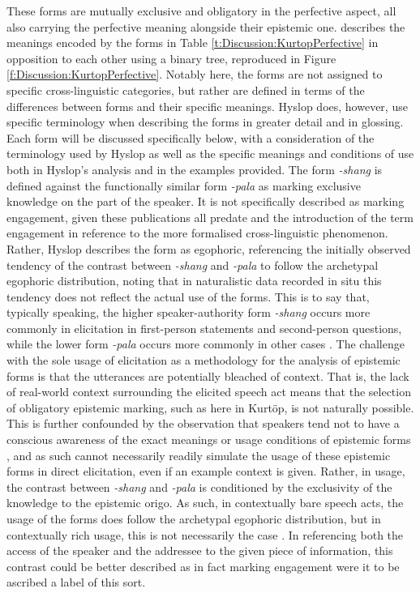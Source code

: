 These forms are mutually exclusive and obligatory in the perfective aspect, all also carrying the perfective meaning alongside their epistemic one.  describes the meanings encoded by the forms in Table \ref{t:Discussion:KurtopPerfective} in opposition to each other using a binary tree, reproduced in Figure \ref{f:Discussion:KurtopPerfective}. Notably here, the forms are not assigned to specific cross-linguistic categories, but rather are defined in terms of the differences between forms and their specific meanings. Hyslop does, however, use specific terminology when describing the forms in greater detail and in glossing. Each form will be discussed specifically below, with a consideration of the terminology used by Hyslop as well as the specific meanings and conditions of use both in Hyslop's analysis and in the examples provided.
The form \textit{-shang} is defined against the functionally similar form \textit{-pala} as marking exclusive knowledge on the part of the speaker. It is not specifically described as marking engagement, given these publications all predate  and the introduction of the term engagement in reference to the more formalised cross-linguistic phenomenon. Rather, Hyslop describes the form as egophoric, referencing the initially observed tendency of the contrast between \textit{-shang} and \textit{-pala} to follow the archetypal egophoric distribution, noting that in naturalistic data recorded in situ this tendency does not reflect the actual use of the forms. This is to say that, typically speaking, the higher speaker-authority form \textit{-shang} occurs more commonly in elicitation in first-person statements and second-person questions, while the lower form \textit{-pala} occurs more commonly in other cases \cite[129]{Hyslop2018}. The challenge with the sole usage of elicitation as a methodology for the analysis of epistemic forms is that the utterances are potentially bleached of context. That is, the lack of real-world context surrounding the elicited speech act means that the selection of obligatory epistemic marking, such as here in Kurtöp, is not naturally possible. This is further confounded by the observation that speakers tend not to have a conscious awareness of the exact meanings or usage conditions of epistemic forms \cite{Grzech2020}, and as such cannot necessarily readily simulate the usage of these epistemic forms in direct elicitation, even if an example context is given. Rather, in usage, the contrast between \textit{-shang} and \textit{-pala} is conditioned by the exclusivity of the knowledge to the epistemic origo. As such, in contextually bare speech acts, the usage of the forms does follow the archetypal egophoric distribution, but in contextually rich usage, this is not necessarily the case \cite{Hyslop2018}. In referencing both the access of the speaker and the addressee to the given piece of information, this contrast could be better described as in fact marking engagement were it to be ascribed a label of this sort.

